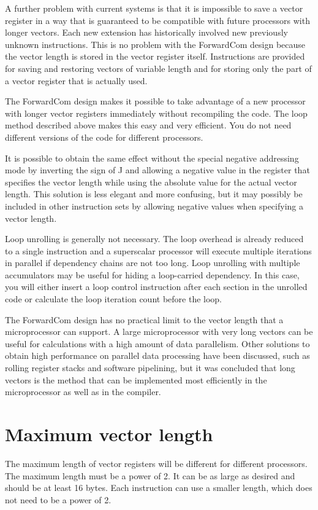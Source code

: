 \documentclass[forwardcom.tex]{subfiles}
\begin{document}
A further problem with current systems is that it is impossible to save a vector register in a way that is guaranteed to be compatible with future processors with longer vectors. Each new extension has historically involved new previously unknown instructions. 
This is no problem with the ForwardCom design because the vector length is stored in the vector register itself. Instructions are provided for saving and restoring vectors of variable length and for storing only the part of a vector register that is actually used.
\vv

The ForwardCom design makes it possible to take advantage of a new processor with longer vector registers immediately without recompiling the code. The loop method described above makes this easy and very efficient. You do not need different versions of the code for different processors.
\vv

It is possible to obtain the same effect without the special negative addressing mode by inverting the sign of J and allowing a negative value in the register that specifies the vector length while using the absolute value for the actual vector length. This solution is less elegant and more confusing, but it may possibly be included in other instruction sets by allowing negative values when specifying a vector length.
\vv

Loop unrolling is generally not necessary. The loop overhead is already reduced to a single instruction  and a superscalar processor will execute multiple iterations in parallel if dependency chains are not too long. Loop unrolling with multiple accumulators may be useful for hiding a loop-carried dependency. In this case, you will either insert a loop control instruction after each section in the unrolled code or calculate the loop iteration count before the loop.
\vv

The ForwardCom design has no practical limit to the vector length that a microprocessor can support. A large microprocessor with very long vectors can be useful for calculations with a high amount of data parallelism. Other solutions to obtain high performance on parallel data processing have been discussed, such as rolling register stacks and software pipelining, but it was concluded that long vectors is the method that can be implemented most efficiently in the microprocessor as well as in the compiler.

\section{Maximum vector length}
The maximum length of vector registers will be different for different processors. The maximum length must be a power of 2. It can be as large as desired and should be at least 16 bytes. Each instruction can use a smaller length, which does not need to be a power of 2.
\vv
\end{document}
